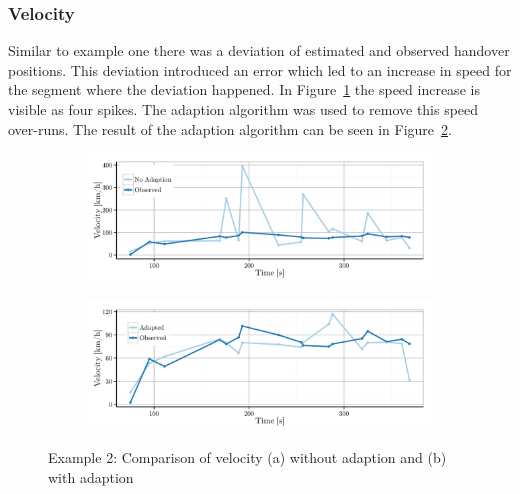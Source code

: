\subsubsection{Velocity}
Similar to example one there was a deviation of estimated and observed handover positions. This deviation introduced an error which led to an increase in speed for the segment where the deviation happened. In Figure~\ref{fig:1058_velocityNoAdapt} the speed increase is visible as four spikes. The adaption algorithm was used to remove this speed over-runs. The result of the adaption algorithm can be seen in Figure~\ref{fig:1058_velocityAdapt}.






\begin{figure}
	\centering
	\begin{subfigure}[b]{\textwidth}
		\includegraphics[width=\textwidth]{./images/1058_velocityNoAdapt}
		\caption{}
		\label{fig:1058_velocityNoAdapt}
	\end{subfigure}%

	\begin{subfigure}[b]{\textwidth}
		\includegraphics[width=\textwidth]{./images/1058_velocityAdapt}
		\caption{}
		\label{fig:1058_velocityAdapt}
	\end{subfigure}
	\caption{Example 2: Comparison of velocity (a) without adaption  and (b) with adaption}\label{fig:1058velocity}
\end{figure}


